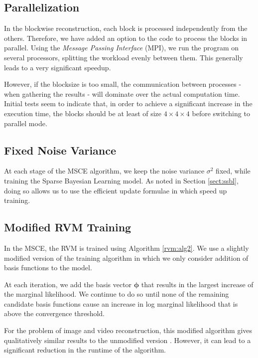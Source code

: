 \subsection{Parallelization}
In the blockwise reconstruction, each block is processed independently from the others.
Therefore, we have added an option to the code to process the blocks in parallel.
Using the \emph{Message Passing Interface} (MPI), we run the program on several processors, splitting the workload evenly between them. This generally leads to a very significant speedup.

However, if the blocksize is too small, the communication between processes - when gathering the results - will dominate over the actual computation time.
Initial tests seem to indicate that, in order to achieve a significant increase in the execution time, the blocks should be at least of size $4\times4\times4$ before switching to parallel mode.


\subsection{Fixed Noise Variance}
At each stage of the MSCE algorithm, we keep the noise variance $\sigma^2$ fixed, while training the Sparse Bayesian Learning model.
As noted in Section \ref{sect:ssbl}, doing so allows us to use the efficient update formulae in \cite{tipping2003} which speed up training.

\subsection{Modified RVM Training}
In the MSCE, the RVM is trained using Algorithm \ref{rvm:alg2}.
We use a slightly modified version of the training algorithm in which we only consider addition of basis functions to the model.

At each iteration, we add the basis vector $\bm\phi$ that results in the largest increase of the marginal likelihood.
We continue to do so until none of the remaining candidate basis functions cause an increase in log marginal likelihood that is above the convergence threshold.

For the problem of image and video reconstruction, this modified algorithm gives qualitatively similar results to the unmodified version \cite{pilikos2014}. However, it can lead to a significant reduction in the runtime of the algorithm.

